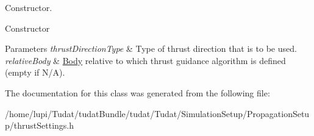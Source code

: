 Constructor. 

Constructor 
\begin{DoxyParams}{Parameters}
{\em thrust\+Direction\+Type} & Type of thrust direction that is to be used. \\
\hline
{\em relative\+Body} & \hyperlink{classtudat_1_1simulation__setup_1_1Body}{Body} relative to which thrust guidance algorithm is defined (empty if N/A). \\
\hline
\end{DoxyParams}


The documentation for this class was generated from the following file\+:\begin{DoxyCompactItemize}
\item 
/home/lupi/\+Tudat/tudat\+Bundle/tudat/\+Tudat/\+Simulation\+Setup/\+Propagation\+Setup/thrust\+Settings.\+h\end{DoxyCompactItemize}
